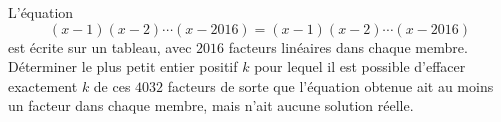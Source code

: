 L'équation
\[
(x-1)(x-2)\cdots(x-2016) = (x-1)(x-2)\cdots(x-2016)
\]
est écrite sur un tableau, avec $2016$ facteurs linéaires dans chaque membre. Déterminer le plus petit entier
positif $k$ pour lequel il est possible d'effacer exactement $k$ de ces $4032$ facteurs de sorte que
l'équation obtenue ait au moins un facteur dans chaque membre, mais n'ait aucune solution réelle.
